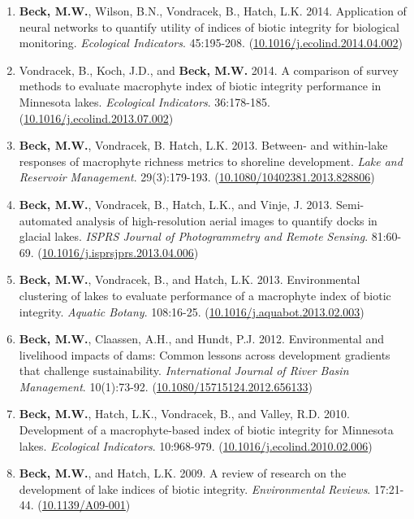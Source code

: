 \documentclass[letterpaper,12pt]{article}
\begin{document}
\begin{enumerate}
\item \textbf{Beck, M.W.}, Wilson, B.N., Vondracek, B., Hatch, L.K. 2014. Application of neural networks to quantify utility of indices of biotic integrity for biological monitoring. \textit{Ecological Indicators}. 45:195-208. ({\footnotesize\href{https://doi.org/10.1016/j.ecolind.2014.04.002}{10.1016/j.ecolind.2014.04.002}})

\item Vondracek, B., Koch, J.D., and \textbf{Beck, M.W.} 2014. A comparison of survey methods to evaluate macrophyte index of biotic integrity performance in Minnesota lakes. \textit{Ecological Indicators}. 36:178-185. ({\footnotesize\href{https://doi.org/10.1016/j.ecolind.2013.07.002}{10.1016/j.ecolind.2013.07.002}})

\item \textbf{Beck, M.W.}, Vondracek, B. Hatch, L.K. 2013. Between- and within-lake responses of macrophyte richness metrics to shoreline development. \textit{Lake and Reservoir Management}. 29(3):179-193. ({\footnotesize\href{http://dx.doi.org/10.1080/10402381.2013.828806}{10.1080/10402381.2013.828806}})

\item \textbf{Beck, M.W.}, Vondracek, B., Hatch, L.K., and Vinje, J. 2013. Semi-automated analysis of high-resolution aerial images to quantify docks in glacial lakes. \textit{ISPRS Journal of Photogrammetry and Remote Sensing}. 81:60-69. ({\footnotesize\href{https://doi.org/10.1016/j.isprsjprs.2013.04.006}{10.1016/j.isprsjprs.2013.04.006}})

\item \textbf{Beck, M.W.}, Vondracek, B., and Hatch, L.K. 2013. Environmental clustering of lakes to evaluate performance of a macrophyte index of biotic integrity. \textit{Aquatic Botany}. 108:16-25. ({\footnotesize\href{https://doi.org/10.1016/j.aquabot.2013.02.003}{10.1016/j.aquabot.2013.02.003}})

\item \textbf{Beck, M.W.}, Claassen, A.H., and Hundt, P.J. 2012. Environmental and livelihood impacts of dams: Common lessons across development gradients that challenge sustainability. \textit{International Journal of River Basin Management}. 10(1):73-92. ({\footnotesize\href{http://dx.doi.org/10.1080/15715124.2012.656133}{10.1080/15715124.2012.656133}})

\item \textbf{Beck, M.W.}, Hatch, L.K., Vondracek, B., and Valley, R.D. 2010. Development of a macrophyte-based index of biotic integrity for Minnesota lakes. \textit{Ecological Indicators}. 10:968-979. ({\footnotesize\href{https://doi.org/10.1016/j.ecolind.2010.02.006}{10.1016/j.ecolind.2010.02.006}})

\item \textbf{Beck, M.W.}, and Hatch, L.K. 2009. A review of research on the development of lake indices of biotic integrity. \textit{Environmental Reviews}. 17:21-44. ({\footnotesize\href{https://doi.org/10.1139/A09-001}{10.1139/A09-001}})

\end{enumerate}
\end{document}
